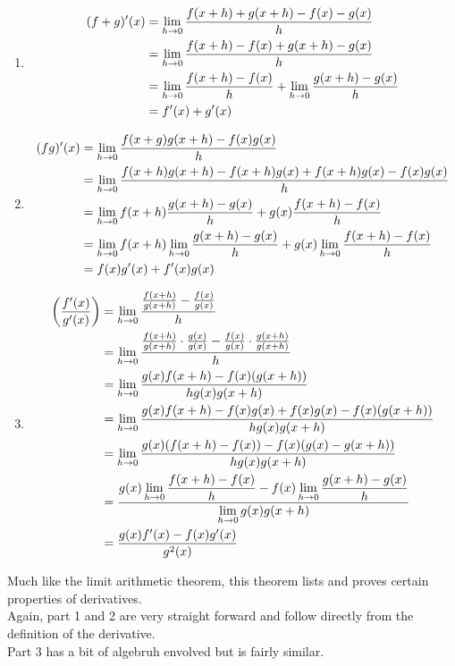 \documentclass[12pt]{article}
\begin{document}
\begin{prf}{}
\begin{enumerate}
    \item 
    \begin{align*}
    (f+g)'(x) &= \displaystyle\lim_{h\to 0}\frac{f(x+h) + g(x + h) - f(x) - g(x)}{h}\\
    &= \displaystyle\lim_{h\to 0}\frac{f(x+h) - f(x) + g(x+h) - g(x)}{h}\\
    &= \displaystyle\lim_{h\to 0}\frac{f(x+h)-f(x)}{h} + \displaystyle\lim_{h\to 0}\frac{g(x+h) - g(x)}{h}\\
    &= f'(x) + g'(x)   
    \end{align*}
    \item 
    \begin{align*}
    (fg)'(x) &= \displaystyle\lim_{h\to 0}\frac{f(x+g)g(x+h) - f(x)g(x)}{h}\\
    &= \displaystyle\lim_{h\to 0}\frac{f(x+h)g(x+h) - f(x+h)g(x) + f(x+h)g(x) - f(x)g(x)}{h}\\
    &= \displaystyle\lim_{h\to 0}f(x+h)\frac{g(x+h) - g(x)}{h} + g(x)\frac{f(x+h) - f(x)}{h}\\
    &= \displaystyle\lim_{h\to 0}f(x+h)\displaystyle\lim_{h\to 0}\frac{g(x+h) - g(x)}{h} + g(x)\displaystyle\lim_{h\to 0}\frac{f(x+h) - f(x)}{h}\\
    &= f(x)g'(x) + f'(x)g(x)
    \end{align*}
    \item 
    \begin{align*}
    \left(\frac{f'(x)}{g'(x)}\right) &= \displaystyle\lim_{h\to 0}\frac{\frac{f(x+h)}{g(x+h)} - \frac{f(x)}{g(x)}}{h}\\
    &=  \displaystyle\lim_{h\to 0}\frac{\frac{f(x+h)}{g(x+h)}\cdot\frac{g(x)}{g(x)} - \frac{f(x)}{g(x)}\cdot\frac{g(x+h)}{g(x+h)}}{h}\\
    &= \displaystyle\lim_{h\to 0}\frac{g(x)f(x+h) - f(x)(g(x+h))}{hg(x)g(x+h)}\\
    &= \displaystyle\lim_{h\to 0}\frac{g(x)f(x+h) -f(x)g(x) + f(x)g(x) - f(x)(g(x+h))}{hg(x)g(x+h)}\\
    &= \displaystyle\lim_{h\to 0}\frac{g(x)(f(x+h) - f(x)) - f(x)(g(x) - g(x+h))}{hg(x)g(x+h)}\\  
    &= \frac{g(x)\displaystyle\lim_{h\to 0}\frac{f(x+h) - f(x)}{h} - f(x)\displaystyle\lim_{h\to 0}\frac{g(x+h) - g(x)}{h}}{\displaystyle\lim_{h\to 0}g(x)g(x+h)}\\
    &= \frac{g(x)f'(x) - f(x)g'(x)}{g^2(x)}
    \end{align*}
\end{enumerate}    
\end{prf}
\begin{explanation}{}
    Much like the limit arithmetic theorem, this theorem lists and proves certain properties of derivatives.\\
    Again, part 1 and 2 are very straight forward and follow directly from the definition of the derivative.\\
    Part 3 has a bit of algebruh envolved but is fairly similar.
\end{explanation}
\end{document}
